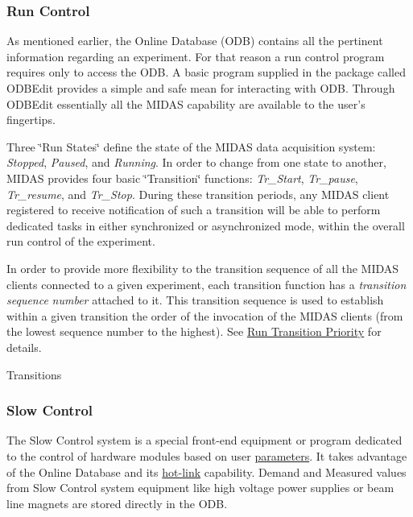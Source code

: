 \label{F_MainElements_idx_run-control_overview}
\hypertarget{F_MainElements_idx_run-control_overview}{}
 \hypertarget{F_MainElements_F_Run_Control_overview}{}\subsubsection{Run Control}\label{F_MainElements_F_Run_Control_overview}
As mentioned earlier, the Online Database (ODB) contains all the pertinent information regarding an experiment. For that reason a run control program requires only to access the ODB. A basic program supplied in the package called ODBEdit provides a simple and safe mean for interacting with ODB. Through ODBEdit essentially all the MIDAS capability are available to the user's fingertips.

Three \char`\"{}Run States\char`\"{} define the state of the MIDAS data acquisition system: {\itshape Stopped\/}, {\itshape Paused\/}, and {\itshape Running\/}. In order to change from one state to another, MIDAS provides four basic \char`\"{}Transition\char`\"{} functions: {\itshape Tr\_\-Start\/}, {\itshape Tr\_\-pause\/}, {\itshape Tr\_\-resume\/}, and {\itshape Tr\_\-Stop\/}. During these transition periods, any MIDAS client registered to receive notification of such a transition will be able to perform dedicated tasks in either synchronized or asynchronized mode, within the overall run control of the experiment.

In order to provide more flexibility to the transition sequence of all the MIDAS clients connected to a given experiment, each transition function has a {\itshape transition\/} {\itshape sequence\/} {\itshape number\/} attached to it. This transition sequence is used to establish within a given transition the order of the invocation of the MIDAS clients (from the lowest sequence number to the highest). See \hyperlink{RC_Run_States_and_Transitions_RC_Transition_priority}{Run Transition Priority} for details.

\begin{center} Transitions  \end{center} 

\label{F_MainElements_idx_slow-control_overview}
\hypertarget{F_MainElements_idx_slow-control_overview}{}
 \hypertarget{F_MainElements_F_Slow_Control_overview}{}\subsubsection{Slow Control}\label{F_MainElements_F_Slow_Control_overview}
The Slow Control system is a special front-\/end equipment or program dedicated to the control of hardware modules based on user \hyperlink{structparameters}{parameters}. It takes advantage of the Online Database and its \hyperlink{RC_Hot_Link}{hot-\/link} capability. Demand and Measured values from Slow Control system equipment like high voltage power supplies or beam line magnets are stored directly in the ODB.

